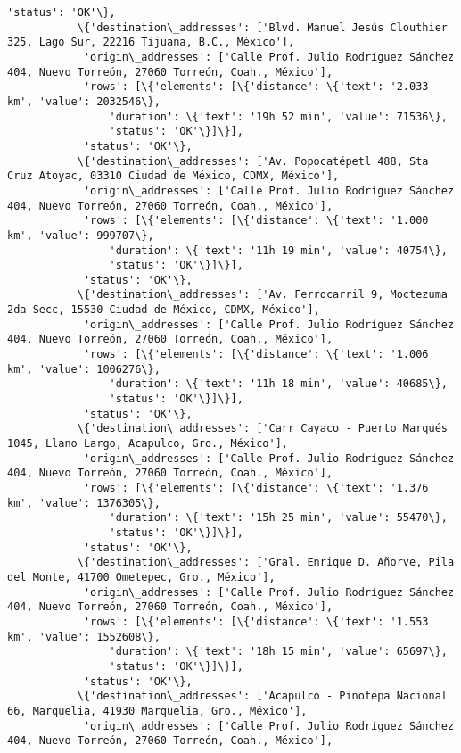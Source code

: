 \documentclass[11pt]{article}
\begin{document}
\begin{Verbatim}[commandchars=\\\{\}]
            'status': 'OK'\},
           \{'destination\_addresses': ['Blvd. Manuel Jesús Clouthier 325, Lago Sur, 22216 Tijuana, B.C., México'],
            'origin\_addresses': ['Calle Prof. Julio Rodríguez Sánchez 404, Nuevo Torreón, 27060 Torreón, Coah., México'],
            'rows': [\{'elements': [\{'distance': \{'text': '2.033 km', 'value': 2032546\},
                'duration': \{'text': '19h 52 min', 'value': 71536\},
                'status': 'OK'\}]\}],
            'status': 'OK'\},
           \{'destination\_addresses': ['Av. Popocatépetl 488, Sta Cruz Atoyac, 03310 Ciudad de México, CDMX, México'],
            'origin\_addresses': ['Calle Prof. Julio Rodríguez Sánchez 404, Nuevo Torreón, 27060 Torreón, Coah., México'],
            'rows': [\{'elements': [\{'distance': \{'text': '1.000 km', 'value': 999707\},
                'duration': \{'text': '11h 19 min', 'value': 40754\},
                'status': 'OK'\}]\}],
            'status': 'OK'\},
           \{'destination\_addresses': ['Av. Ferrocarril 9, Moctezuma 2da Secc, 15530 Ciudad de México, CDMX, México'],
            'origin\_addresses': ['Calle Prof. Julio Rodríguez Sánchez 404, Nuevo Torreón, 27060 Torreón, Coah., México'],
            'rows': [\{'elements': [\{'distance': \{'text': '1.006 km', 'value': 1006276\},
                'duration': \{'text': '11h 18 min', 'value': 40685\},
                'status': 'OK'\}]\}],
            'status': 'OK'\},
           \{'destination\_addresses': ['Carr Cayaco - Puerto Marqués 1045, Llano Largo, Acapulco, Gro., México'],
            'origin\_addresses': ['Calle Prof. Julio Rodríguez Sánchez 404, Nuevo Torreón, 27060 Torreón, Coah., México'],
            'rows': [\{'elements': [\{'distance': \{'text': '1.376 km', 'value': 1376305\},
                'duration': \{'text': '15h 25 min', 'value': 55470\},
                'status': 'OK'\}]\}],
            'status': 'OK'\},
           \{'destination\_addresses': ['Gral. Enrique D. Añorve, Pila del Monte, 41700 Ometepec, Gro., México'],
            'origin\_addresses': ['Calle Prof. Julio Rodríguez Sánchez 404, Nuevo Torreón, 27060 Torreón, Coah., México'],
            'rows': [\{'elements': [\{'distance': \{'text': '1.553 km', 'value': 1552608\},
                'duration': \{'text': '18h 15 min', 'value': 65697\},
                'status': 'OK'\}]\}],
            'status': 'OK'\},
           \{'destination\_addresses': ['Acapulco - Pinotepa Nacional 66, Marquelia, 41930 Marquelia, Gro., México'],
            'origin\_addresses': ['Calle Prof. Julio Rodríguez Sánchez 404, Nuevo Torreón, 27060 Torreón, Coah., México'],

\end{Verbatim}
\end{document}

